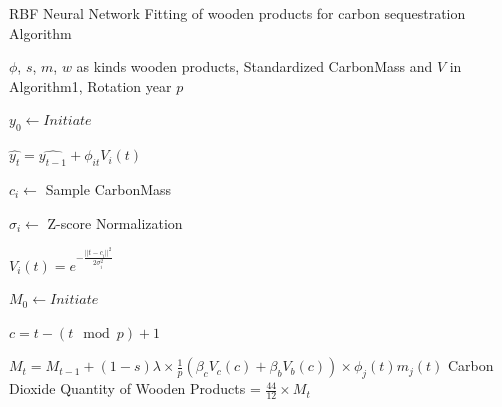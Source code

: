 \documentclass{mcmthesis}
\numberwithin{figure}{section}
\numberwithin{table}{section}
\numberwithin{equation}{section}
\begin{document}
  \begin{algorithm}[htbp]
    \caption{RBF Neural Network Fitting of wooden products for carbon sequestration Algorithm} \label{Product Algo}
    \begin{algorithmic}[1]
        \Require
            $ \phi $, $ s $, $ m $, $ w $ as kinds wooden products, Standardized CarbonMass and $ V $ in Algorithm1,
            Rotation year $ p $ 

                $ y_0 \gets Initiate $ 

                $ \hat{y_t} = \hat{y_{t-1}} + \phi_{it}V_i(t) $
            
                $ c_i\gets $ Sample CarbonMass
            
                $ \sigma_i\gets $ Z-score Normalization

                $ V_i(t) = e^{-\frac{||t-c_i||^2}{2\sigma_i^2}} $
            \EndFor

            $ M_0\gets Initiate $ 

            $ c = t-(t\mod p)+1 $ 



            $ M_t = M_{t-1}+(1-s)\lambda \times \frac{1}{p} (\beta_cV_c(c)+\beta_bV_b(c))\times \phi_j(t)m_j(t)$ 
            \EndFor
        \EndFor
        \Ensure
        Carbon Dioxide Quantity of Wooden Products = $ \frac{44}{12} \times M_t$ 
    \end{algorithmic}
\end{algorithm}
\end{document}
